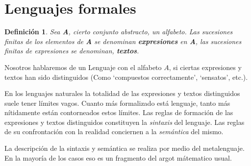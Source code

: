 \documentclass[a4paper,12pt]{article}
\newtheorem{definicion}{Definición}[subsection]
\begin{document}
\section{Lenguajes formales}


\begin{definicion}
    Sea  \textbf{A}, cierto conjunto abstracto, un alfabeto. Las sucesiones finitas de los elementos de \textbf{A} se denominan
    \textbf{expresiones} en \textbf{A}, las sucesiones finitas de expresiones se denominan, \textbf{textos}.
\end{definicion}

Nosotros hablaremos de un Lenguaje con el alfabeto $A$, si ciertas expresiones y textos han sido distinguidos
(Como `compuestos correctamente', `sensatos', etc.).

En los lenguajes naturales la totalidad de las expresiones y textos
distinguidos suele tener límites vagos. Cuanto más formalizado está lenguaje, tanto más nítidamente están contorneados
estos límites.
Las reglas  de formación de las expresiones y textos distinguidos constituyen  la \textit{sintaxis} del lenguaje.
Las reglas de su confrontación con la realidad conciernen a la \textit{semántica} del mismo.

La descripción de la sintaxis y semántica se realiza por medio del metalenguaje. En la mayoría de los casos eso es un
fragmento del argot mátematico usual.
\end{document}
